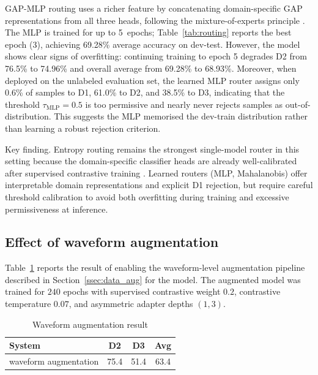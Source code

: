 \documentclass{article}
\begin{document}
\begin{sloppy}
\noindent GAP-MLP routing uses a richer feature by concatenating
domain-specific GAP representations from all three heads, following the
mixture-of-experts principle \cite{jacobs1991moe}.  The MLP is trained
for up to 5~epochs; Table~\ref{tab:routing} reports the best epoch (3),
achieving 69.28\% average accuracy on dev-test. However, the model shows
clear signs of overfitting: continuing training to epoch 5 degrades D2 from
76.5\% to 74.96\% and overall average from 69.28\% to 68.93\%.  Moreover,
when deployed on the unlabeled evaluation set, the learned MLP router assigns
only 0.6\% of samples to D1, 61.0\% to D2, and 38.5\% to D3, indicating that
the threshold $\tau_{\mathrm{MLP}}=0.5$ is too permissive and nearly never
rejects samples as out-of-distribution. This suggests the MLP memorised the
dev-train distribution rather than learning a robust rejection criterion.

\noindent Key finding.  Entropy routing remains the strongest
single-model router in this setting because the domain-specific classifier
heads are already well-calibrated after supervised contrastive training
\cite{lakshminarayanan2017ensembles}.  Learned routers (MLP, Mahalanobis)
offer interpretable domain representations and explicit D1 rejection, but
require careful threshold calibration to avoid both overfitting during
training and excessive permissiveness at inference.


\subsection{Effect of waveform augmentation}
\label{ssec:aug_results}
Table~\ref{tab:augmentation} reports the result of enabling the waveform-level
augmentation pipeline described in Section~\ref{ssec:data_aug} for the model.  The augmented model was trained for
$240$ epochs with supervised contrastive weight $0.2$, contrastive temperature
$0.07$, and asymmetric adapter depths $(1,3)$.

\begin{table}[t]
  \centering
  \caption{Waveform augmentation result}
  \label{tab:augmentation}
  \begin{tabularx}{\columnwidth}{Xccc}
    \toprule
    System & D2 & D3 & Avg \\
    \midrule
    waveform augmentation
      & 75.4 & 51.4 & 63.4 \\
    \bottomrule
  \end{tabularx}
\end{table}


\end{sloppy}
\end{document}

